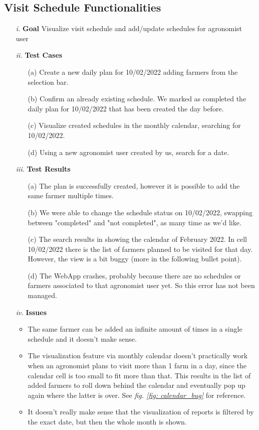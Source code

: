 \documentclass[table, 12pt]{article}
\begin{document}
\subsection{Visit Schedule Functionalities}
\begin{itemize}
    \item[\textit{i.}] \textbf{Goal} Visualize visit schedule and add/update schedules for agronomist user
    \item[\textit{ii.}] \textbf{Test Cases}
    \begin{itemize}
        \item[(a)] Create a new daily plan for 10/02/2022 adding farmers from the selection bar.
        \item[(b)] Confirm an already existing schedule. We marked as completed the daily plan for 10/02/2022 that has been created the day before.
        \item[(c)] Visualize created schedules in the monthly calendar, searching for 10/02/2022.
        \item[(d)] Using a new agronomist user created by us, search for a date.
    \end{itemize} 
    \item[\textit{iii.}] \textbf{Test Results}
    \begin{itemize}
        \item[(a)] The plan is successfully created, however it is possible to add the same farmer multiple times.
        \item[(b)] We were able to change the schedule status on 10/02/2022, swapping between "completed" and "not completed", as many time as we'd like.
        \item[(c)] The search results in showing the calendar of February 2022. In cell 10/02/2022 there is the list of farmers planned to be visited for that day. However, the view is a bit buggy (more in the following bullet point).
        \item[(d)] The WebApp crashes, probably because there are no schedules or farmers associated to that agronomist user yet. So this error has not been managed.
    \end{itemize} 
    \item[\textit{iv.}] \textbf{Issues}
    \begin{itemize}
        \item The same farmer can be added an infinite amount of times in a single schedule and it doesn't make sense.
        \item The visualization feature via monthly calendar doesn't practically work when an agronomist plans to visit more than 1 farm in a day, since the calendar cell is too small to fit more than that. This results in the list of added farmers to roll down behind the calendar and eventually pop up again where the latter is over. See \emph{fig. \ref{fig: calendar_bug}} for reference.
        \item It doesn't really make sense that the visualization of reports is filtered by the exact date, but then the whole month is shown.
    \end{itemize} 
\end{itemize}
\end{document}
